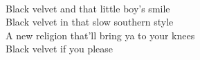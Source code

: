 \\
Black velvet and that little boy's smile \\
Black velvet in that slow southern style \\
A new religion that'll bring ya to your knees \\
Black velvet if you please \\
